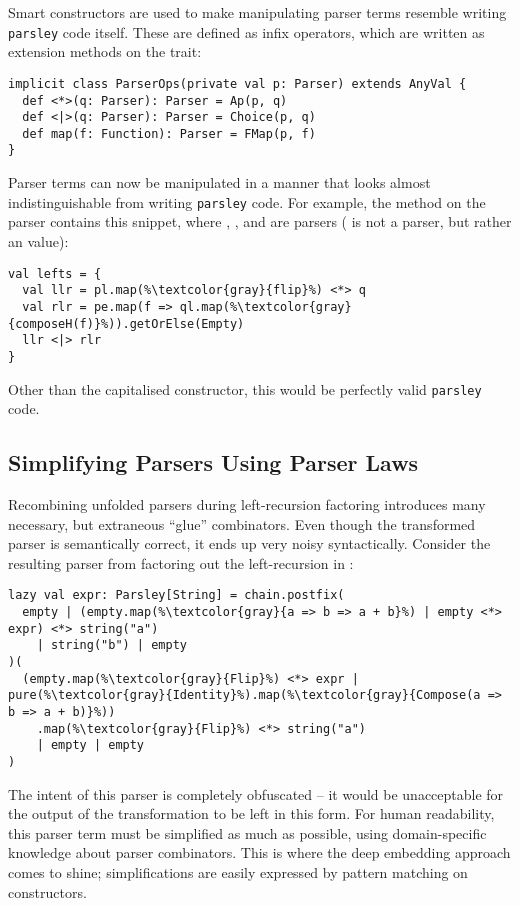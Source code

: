 \documentclass[../../main.tex]{subfiles}
\begin{document}
Smart constructors are used to make manipulating parser terms resemble writing \texttt{parsley} code itself.
These are defined as infix operators, which are written as extension methods on the  trait:
\begin{verbatim}
implicit class ParserOps(private val p: Parser) extends AnyVal {
  def <*>(q: Parser): Parser = Ap(p, q)
  def <|>(q: Parser): Parser = Choice(p, q)
  def map(f: Function): Parser = FMap(p, f)
}
\end{verbatim}
%
Parser terms can now be manipulated in a manner that looks almost indistinguishable from writing \texttt{parsley} code.
For example, the  method on the  parser contains this snippet, where , , and  are parsers ( is not a parser, but rather an  value):
\begin{verbatim}
val lefts = {
  val llr = pl.map(%\textcolor{gray}{flip}%) <*> q
  val rlr = pe.map(f => ql.map(%\textcolor{gray}{composeH(f)}%)).getOrElse(Empty)
  llr <|> rlr
}
\end{verbatim}
Other than the capitalised  constructor, this would be perfectly valid \texttt{parsley} code.

\subsection{Simplifying Parsers Using Parser Laws}\label{sec:simplify-parsers}
Recombining unfolded parsers during left-recursion factoring introduces many necessary, but extraneous ``glue'' combinators.
Even though the transformed parser is semantically correct, it ends up very noisy syntactically.
Consider the resulting parser from factoring out the left-recursion in :
\begin{verbatim}
lazy val expr: Parsley[String] = chain.postfix(
  empty | (empty.map(%\textcolor{gray}{a => b => a + b}%) | empty <*> expr) <*> string("a")
    | string("b") | empty
)(
  (empty.map(%\textcolor{gray}{Flip}%) <*> expr | pure(%\textcolor{gray}{Identity}%).map(%\textcolor{gray}{Compose(a => b => a + b)}%))
    .map(%\textcolor{gray}{Flip}%) <*> string("a")
    | empty | empty
)
\end{verbatim}
%
The intent of this parser is completely obfuscated -- it would be unacceptable for the output of the transformation to be left in this form.
For human readability, this parser term must be simplified as much as possible, using domain-specific knowledge about parser combinators.
This is where the deep embedding approach comes to shine; simplifications are easily expressed by pattern matching on  constructors.
\end{document}
